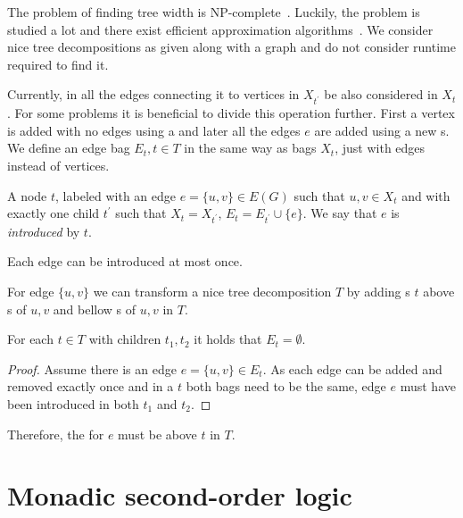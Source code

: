The problem of finding tree width is NP-complete~\cite{tree_width_np_complete}.
Luckily, the problem is studied a lot and
there exist efficient approximation algorithms~\cite{tree_width_approximation}.
We consider nice tree decompositions as given along with a graph
and do not consider runtime required to find it.

Currently, in \IntroduceVertexNode{} all the edges connecting it
to vertices in \( X_{t^\prime} \) be also considered in \( X_t \).
For some problems it is beneficial to divide this operation further.
First a vertex is added with no edges using a \IntroduceVertexNode{}
and later all the edges \( e \) are added using a new \IntroduceEdgeNode{}s.
We define an edge bag \( E_t, t \in T \) in the same way as bags \( X_t \),
just with edges instead of vertices.
%
\begin{definition}
	A node \( t \), labeled with an edge \( e = \{u, v\} \in E(G) \)
	such that \( u, v \in X_t \) and with exactly one child \( t^\prime \)
	such that \( X_t = X_{t^\prime} \), \( E_t = E_{t^\prime} \cup \{e\} \).
	We say that \( e \) is \emph{introduced} by \( t \).
\end{definition}
%
Each edge can be introduced at most once.

For edge \( \{u, v\} \) we can transform a nice tree decomposition \( T \)
by adding \IntroduceEdgeNode{}s \( t \) above \IntroduceVertexNode{}s of \( u, v \)
and bellow \ForgetVertexNode{}s of \( u, v \) in \( T \).

%
\begin{lemma}
	For each \JoinNode{} \( t \in T \) with children \( t_1, t_2 \)
	it holds that \( E_t = \emptyset \).
\end{lemma}
%
\begin{proof}
	Assume there is an edge \( e = \{u, v\} \in E_t \).
	As each edge can be added and removed exactly once
	and in a \JoinNode{} \( t \) both bags need to be the same,
	edge \( e \) must have been introduced in both \( t_1 \) and \( t_2 \).
\end{proof}
%
Therefore, the \IntroduceEdgeNode{} for \( e \) must be above \( t \) in \( T \).

\section{Monadic second-order logic}


